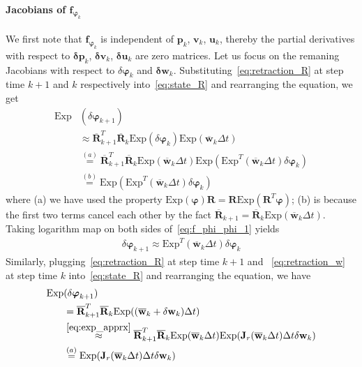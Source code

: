 \paragraph{Jacobians of $\mathbf{f}_{\boldsymbol{\varphi}_{k}}$}
We first note that $\mathbf{f}_{\boldsymbol{\varphi}_{k}}$ is independent of $\mathbf{p}_k$, $\mathbf{v}_k$, $\mathbf{u}_k$, thereby the partial derivatives with respect to $\mathbf{\delta p}_k$, $\mathbf{\delta v}_k$, $\mathbf{\delta u}_k$ are zero matrices. Let us focus on the remaning Jacobians with respect to $\delta\boldsymbol{\varphi}_k$ and $\mathbf{\delta w}_k$. Substituting~\eqref{eq:retraction_R} at step time $k+1$ and $k$ respectively into~\eqref{eq:state_R} and rearranging the equation, we get
\begin{align}
\label{eq:f_phi_phi_1}
\mathrm{Exp}&(\delta{\boldsymbol{\varphi}}_{k+1}) \nonumber\\ 
&\approx \overline{\mathbf{R}}_{k+1}^T \overline{\mathbf{R}}_{k} \mathrm{Exp}(\delta{\boldsymbol{\varphi}}_{k}) \mathrm{Exp}(\overline{\mathbf{w}}_{k} \Delta{t}) \nonumber\\
&\overset{(a)}{=} \overline{\mathbf{R}}_{k+1}^T \overline{\mathbf{R}}_{k} \mathrm{Exp}(\overline{\mathbf{w}}_{k} \Delta{t}) \mathrm{Exp}(\mathrm{Exp}^T(\overline{\mathbf{w}}_{k} \Delta{t}) \delta{\boldsymbol{\varphi}}_{k}) \nonumber\\
&\overset{(b)}{=} \mathrm{Exp}(\mathrm{Exp}^T(\overline{\mathbf{w}}_{k} \Delta{t}) \delta{\boldsymbol{\varphi}}_{k})
\end{align}
where (a) we have used the property $\mathrm{Exp}(\boldsymbol{\varphi})\mathbf{R}=\mathbf{R}\mathrm{Exp}(\mathbf{R}^T \boldsymbol{\varphi})$; (b) is because the first two terms cancel each other by the fact $\overline{\mathbf{R}}_{k+1} = \overline{\mathbf{R}}_{k} \mathrm{Exp}(\overline{\mathbf{w}}_k \Delta{t})$. Taking logarithm map on both sides of~\eqref{eq:f_phi_phi_1} yields
\begin{align}
\label{eq:f_phi_phi_2}
\delta{\boldsymbol{\varphi}}_{k+1} \approx \mathrm{Exp}^T(\overline{\mathbf{w}}_{k} \Delta{t}) \delta{\boldsymbol{\varphi}}_{k}
\end{align}
Similarly, plugging~\eqref{eq:retraction_R} at step time $k+1$ and ~\eqref{eq:retraction_w} at step time $k$ into~\eqref{eq:state_R} and rearranging the equation, we have
\begin{align}
\label{eq:f_phi_w_1}
\mathrm{Exp}&(\delta{\boldsymbol{\varphi}}_{k+1}) \nonumber\\ 
&= \overline{\mathbf{R}}_{k+1}^T \overline{\mathbf{R}}_{k} \mathrm{Exp}((\overline{\mathbf{w}}_{k} + \delta{\mathbf{w}_{k}}) \Delta{t}) \nonumber \\
&\overset{\eqref{eq:exp_apprx}}{\approx} \overline{\mathbf{R}}_{k+1}^T \overline{\mathbf{R}}_{k} \mathrm{Exp}(\overline{\mathbf{w}}_{k} \Delta{t})\mathrm{Exp}(\mathbf{J}_r(\overline{\mathbf{w}}_{k} \Delta{t}) \Delta{t}\delta{\mathbf{w}_{k}}) \nonumber\\
&\overset{(a)}{=} \mathrm{Exp}(\mathbf{J}_r(\overline{\mathbf{w}}_{k} \Delta{t}) \Delta{t} \delta{\mathbf{w}_{k}} )
\end{align}
